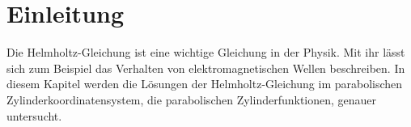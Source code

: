 %
%
%
\section{Einleitung\label{parzyl:section:teil0}}
Die Helmholtz-Gleichung ist eine wichtige Gleichung in der Physik. 
%
Mit ihr lässt sich zum Beispiel das Verhalten von elektromagnetischen Wellen beschreiben.
%
In diesem Kapitel werden die Lösungen der Helmholtz-Gleichung im parabolischen Zylinderkoordinatensystem, 
die parabolischen Zylinderfunktionen, genauer untersucht.
%
%

